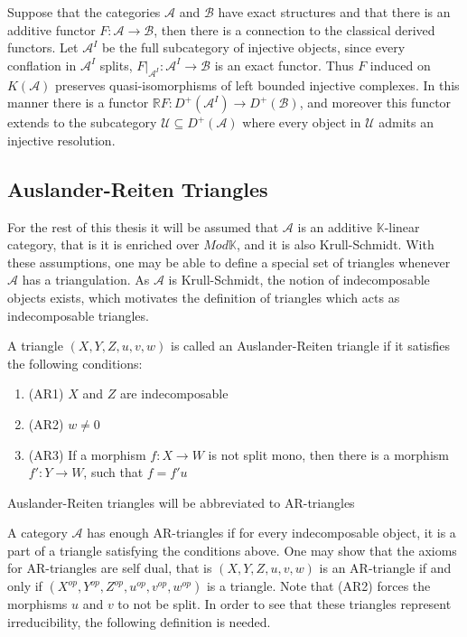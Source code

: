        Suppose that the categories $\mathcal{A}$ and $\mathcal{B}$ have exact structures and that there is an additive functor $F:\mathcal{A}\rightarrow \mathcal{B}$, then there is a connection to the classical derived functors. Let $\mathcal{A}^I$ be the full subcategory of injective objects, since every conflation in $\mathcal{A}^I$ splits, $F|_{\mathcal{A}^{I}}:\mathcal{A}^I\rightarrow \mathcal{B}$ is an exact functor. Thus $F$ induced on $K(\mathcal{A})$ preserves quasi-isomorphisms of left bounded injective complexes. In this manner there is a functor $\mathbb{R}F:D^+(\mathcal{A}^I)\rightarrow D^+(\mathcal{B})$, and moreover this functor extends to the subcategory $\mathcal{U}\subseteq D^+(\mathcal{A})$ where every object in $\mathcal{U}$ admits an injective resolution.

    \subsection{Auslander-Reiten Triangles}

        For the rest of this thesis it will be assumed that $\mathcal{A}$ is an additive $\mathbb{K}$-linear category, that is it is enriched over $Mod \mathbb{K}$, and it is also Krull-Schmidt. With these assumptions, one may be able to define a special set of triangles whenever $\mathcal{A}$ has a triangulation. As $\mathcal{A}$ is Krull-Schmidt, the notion of indecomposable objects exists, which motivates the definition of triangles which acts as indecomposable triangles.

        \begin{definition}
            A triangle $(X,Y,Z,u,v,w)$ is called an Auslander-Reiten triangle if it satisfies the following conditions:
            \begin{enumerate}
                \item (AR1) $X$ and $Z$ are indecomposable
                \item (AR2) $w\neq 0$
                \item (AR3) If a morphism $f:X\rightarrow W$ is not split mono, then there is a morphism $f':Y\rightarrow W$, such that $f=f'u$
            \end{enumerate}
            Auslander-Reiten triangles will be abbreviated to AR-triangles
        \end{definition}

        A category $\mathcal{A}$ has enough AR-triangles if for every indecomposable object, it is a part of a triangle satisfying the conditions above. One may show that the axioms for AR-triangles are self dual, that is $(X,Y,Z,u,v,w)$ is an AR-triangle if and only if $(X^{op},Y^{op},Z^{op},u^{op},v^{op},w^{op})$ is a triangle. Note that (AR2) forces the morphisms $u$ and $v$ to not be split. In order to see that these triangles represent irreducibility, the following definition is needed.

